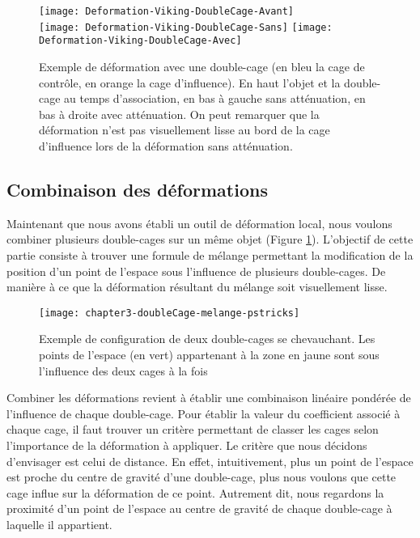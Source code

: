 \begin{figure}[ht]
  \begin{center}
    \texttt{[image: Deformation-Viking-DoubleCage-Avant]}\\
    \texttt{[image: Deformation-Viking-DoubleCage-Sans]}
    \texttt{[image: Deformation-Viking-DoubleCage-Avec]}

    \caption[Exemple de déformation double-cage] {Exemple de déformation avec
une double-cage (en bleu la cage de contrôle, en orange la cage d'influence).
En haut l'objet et la double-cage au temps d'association, en bas à gauche
sans atténuation, en bas à droite avec atténuation. On peut
remarquer que la déformation n'est pas visuellement lisse au bord de la cage
d'influence lors de la déformation sans atténuation.}

  \end{center}
\end{figure}

\subsection{Combinaison des déformations}

Maintenant que nous avons établi un outil de déformation local, nous voulons
combiner plusieurs double-cages sur un même objet (Figure \ref{MELMC}).
L'objectif de cette partie consiste à trouver une formule de mélange
permettant la modification de la position d'un point de l'espace sous
l'influence de plusieurs double-cages. De manière à ce que la déformation
résultant du mélange soit visuellement lisse.

\begin{figure}[ht]
  \begin{center}
    \texttt{[image: chapter3-doubleCage-melange-pstricks]}

    \caption[Mélange de double-cages] {Exemple de
configuration de deux double-cages se chevauchant. Les points
de l'espace (en vert) appartenant à la zone en jaune sont sous l'influence des
deux cages à la fois}

    \label{MELMC}
  \end{center}
\end{figure}

Combiner les déformations revient à établir une combinaison linéaire pondérée
de l'influence de chaque double-cage. Pour établir la valeur du coefficient
associé à chaque cage, il faut trouver un critère permettant de classer les
cages selon l'importance de la déformation à appliquer. Le critère que nous
décidons d'envisager est celui de distance. En effet, intuitivement, plus un
point de l'espace est proche du centre de gravité d'une double-cage, plus nous
voulons que cette cage influe sur la déformation de ce point. Autrement dit,
nous regardons la proximité d'un point de l'espace au centre de gravité de
chaque double-cage à laquelle il appartient.

